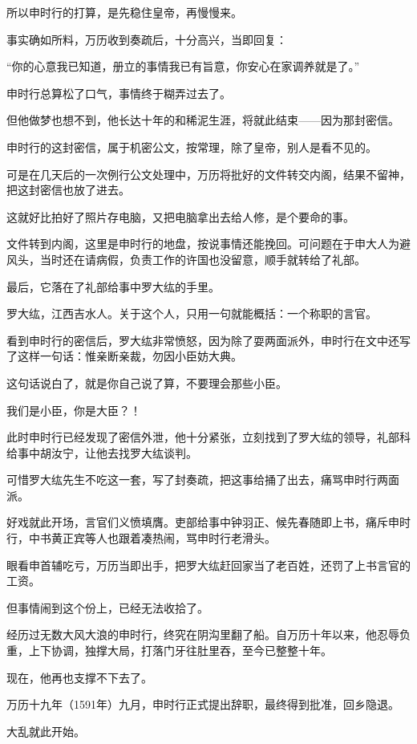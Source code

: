 \begin{multicols}{\theparacolNo}
		所以申时行的打算，是先稳住皇帝，再慢慢来。

		事实确如所料，万历收到奏疏后，十分高兴，当即回复：

		“你的心意我已知道，册立的事情我已有旨意，你安心在家调养就是了。”

		申时行总算松了口气，事情终于糊弄过去了。

		但他做梦也想不到，他长达十年的和稀泥生涯，将就此结束——因为那封密信。

		申时行的这封密信，属于机密公文，按常理，除了皇帝，别人是看不见的。

		可是在几天后的一次例行公文处理中，万历将批好的文件转交内阁，结果不留神，把这封密信也放了进去。

		这就好比拍好了照片存电脑，又把电脑拿出去给人修，是个要命的事。

		文件转到内阁，这里是申时行的地盘，按说事情还能挽回。可问题在于申大人为避风头，当时还在请病假，负责工作的许国也没留意，顺手就转给了礼部。

		最后，它落在了礼部给事中罗大纮的手里。

		罗大纮，江西吉水人。关于这个人，只用一句就能概括：一个称职的言官。

		看到申时行的密信后，罗大纮非常愤怒，因为除了耍两面派外，申时行在文中还写了这样一句话：惟亲断亲裁，勿因小臣妨大典。

		这句话说白了，就是你自己说了算，不要理会那些小臣。

		我们是小臣，你是大臣？！

		此时申时行已经发现了密信外泄，他十分紧张，立刻找到了罗大纮的领导，礼部科给事中胡汝宁，让他去找罗大纮谈判。

		可惜罗大纮先生不吃这一套，写了封奏疏，把这事给捅了出去，痛骂申时行两面派。

		好戏就此开场，言官们义愤填膺。吏部给事中钟羽正、候先春随即上书，痛斥申时行，中书黄正宾等人也跟着凑热闹，骂申时行老滑头。

		眼看申首辅吃亏，万历当即出手，把罗大纮赶回家当了老百姓，还罚了上书言官的工资。

		但事情闹到这个份上，已经无法收拾了。

		经历过无数大风大浪的申时行，终究在阴沟里翻了船。自万历十年以来，他忍辱负重，上下协调，独撑大局，打落门牙往肚里吞，至今已整整十年。

		现在，他再也支撑不下去了。

		万历十九年（1591年）九月，申时行正式提出辞职，最终得到批准，回乡隐退。

		大乱就此开始。

		\ifnum{}
	\end{multicols}
\fi
\newpage
